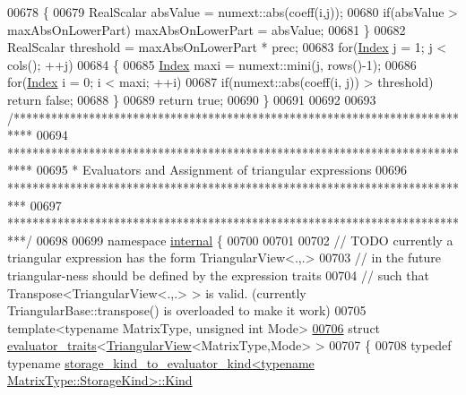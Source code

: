 \begin{DoxyCode}
00678     \{
00679       RealScalar absValue = numext::abs(coeff(i,j));
00680       \textcolor{keywordflow}{if}(absValue > maxAbsOnLowerPart) maxAbsOnLowerPart = absValue;
00681     \}
00682   RealScalar threshold = maxAbsOnLowerPart * prec;
00683   \textcolor{keywordflow}{for}(\hyperlink{namespace_eigen_a62e77e0933482dafde8fe197d9a2cfde}{Index} j = 1; j < cols(); ++j)
00684   \{
00685     \hyperlink{namespace_eigen_a62e77e0933482dafde8fe197d9a2cfde}{Index} maxi = numext::mini(j, rows()-1);
00686     \textcolor{keywordflow}{for}(\hyperlink{namespace_eigen_a62e77e0933482dafde8fe197d9a2cfde}{Index} i = 0; i < maxi; ++i)
00687       \textcolor{keywordflow}{if}(numext::abs(coeff(i, j)) > threshold) \textcolor{keywordflow}{return} \textcolor{keyword}{false};
00688   \}
00689   \textcolor{keywordflow}{return} \textcolor{keyword}{true};
00690 \}
00691 
00692 
00693 \textcolor{comment}{/***************************************************************************}
00694 \textcolor{comment}{****************************************************************************}
00695 \textcolor{comment}{* Evaluators and Assignment of triangular expressions}
00696 \textcolor{comment}{***************************************************************************}
00697 \textcolor{comment}{***************************************************************************/}
00698 
00699 \textcolor{keyword}{namespace }\hyperlink{namespaceinternal}{internal} \{
00700 
00701   
00702 \textcolor{comment}{// TODO currently a triangular expression has the form TriangularView<.,.>}
00703 \textcolor{comment}{//      in the future triangular-ness should be defined by the expression traits}
00704 \textcolor{comment}{//      such that Transpose<TriangularView<.,.> > is valid. (currently TriangularBase::transpose() is
       overloaded to make it work)}
00705 \textcolor{keyword}{template}<\textcolor{keyword}{typename} MatrixType, \textcolor{keywordtype}{unsigned} \textcolor{keywordtype}{int} Mode>
\hyperlink{struct_eigen_1_1internal_1_1evaluator__traits_3_01_triangular_view_3_01_matrix_type_00_01_mode_01_4_01_4}{00706} \textcolor{keyword}{struct }\hyperlink{struct_eigen_1_1internal_1_1evaluator__traits}{evaluator\_traits}<\hyperlink{group___core___module_class_eigen_1_1_triangular_view}{TriangularView}<MatrixType,Mode> >
00707 \{
00708   \textcolor{keyword}{typedef} \textcolor{keyword}{typename} 
      \hyperlink{struct_eigen_1_1internal_1_1_index_based}{storage\_kind\_to\_evaluator\_kind<typename MatrixType::StorageKind>::Kind}

\end{DoxyCode}
